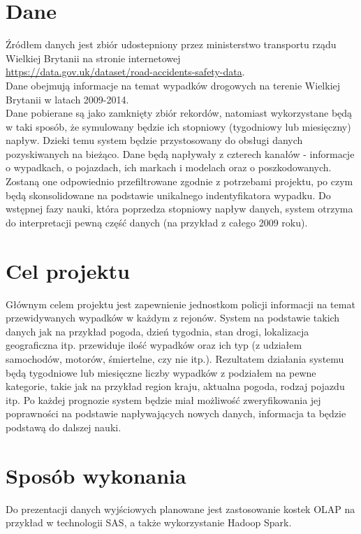 \documentclass{article}
\begin{document}
\section{Dane}

Źródłem danych jest zbiór udostepniony przez ministerstwo transportu rządu Wielkiej Brytanii na stronie internetowej\\ \url{https://data.gov.uk/dataset/road-accidents-safety-data}. \\Dane obejmują informacje na temat wypadków drogowych na terenie Wielkiej Brytanii w latach 2009-2014.\\

Dane pobierane są jako zamknięty zbiór rekordów, natomiast wykorzystane będą w taki sposób, że symulowany będzie ich stopniowy (tygodniowy lub miesięczny) napływ. Dzieki temu system będzie przystosowany do obsługi danych pozyskiwanych na bieżąco. Dane będą napływały z czterech kanałów - informacje o wypadkach, o pojazdach, ich markach i modelach oraz o poszkodowanych. Zostaną one odpowiednio przefiltrowane zgodnie z potrzebami projektu, po czym będą skonsolidowane na podstawie unikalnego indentyfikatora wypadku. Do wstępnej fazy nauki, która poprzedza stopniowy napływ danych, system otrzyma do interpretacji pewną część danych (na przykład z całego 2009 roku).


\section{Cel projektu}

Głównym celem projektu jest zapewnienie jednostkom policji informacji na temat przewidywanych wypadków w każdym z rejonów. System na podstawie takich danych jak na przykład pogoda, dzień tygodnia, stan drogi, lokalizacja geograficzna itp. przewiduje ilość wypadków oraz ich typ (z udziałem samochodów, motorów, śmiertelne, czy nie itp.). Rezultatem działania systemu będą tygodniowe lub miesięczne liczby wypadków z podziałem na pewne kategorie, takie jak na przykład region kraju, aktualna pogoda, rodzaj pojazdu itp. Po każdej prognozie system będzie miał możliwość zweryfikowania jej poprawności na podstawie napływających nowych danych, informacja ta będzie podstawą do dalszej nauki.


\section{Sposób wykonania}
Do prezentacji danych wyjściowych planowane jest zastosowanie kostek OLAP na przykład w technologii SAS, a także wykorzystanie Hadoop Spark.\\
\end{document}
